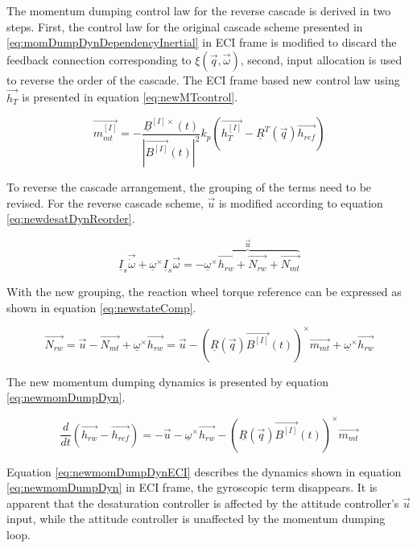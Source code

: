 The momentum dumping control law for the reverse cascade is derived in two steps. First, the control law for the original cascade scheme presented in \ref{eq:momDumpDynDependencyInertial} in ECI frame is modified to discard the feedback connection corresponding to $\xi(\vec{q}, \vec{\omega})$, second, input allocation is used to reverse the order of the cascade. The ECI frame based new control law using $\vec{h_T}$ is presented in equation \ref{eq:newMTcontrol}.

\begin{equation}
\label{eq:newMTcontrol}
\vec{m_{mt}^{[I]}} = -\frac{\underline{B}^{[I]\times}(t)}{|\vec{B^{[I]}}(t) |^2} k_p 
\left(\vec{h_{T}^{[I]}} - \underline{R}^T(\vec{q})\vec{h_{ref}} \right) 
\end{equation}			

To reverse the cascade arrangement, the grouping of the terms need to be revised. For the reverse cascade scheme, $\vec{u}$ is modified according to equation \ref{eq:newdesatDynReorder}.

\begin{equation}
\underline I_{s} \vec{\dot{\omega}} + \underline{\omega}^\times\underline I_{s} \vec{\omega} =    \overbrace{-\underline{\omega}^\times\vec{h_{rw}} + \vec{N_{rw}} +  \vec{N_{mt}}}^{\vec{u}}
\label{eq:newdesatDynReorder}
\end{equation}

With the new grouping, the reaction wheel torque reference can be expressed as shown in equation \ref{eq:newstateComp}.

\begin{equation}
\vec{N_{rw}} =  \vec{u} - \vec{N_{mt}} +  \underline{\omega}^\times\vec{h_{rw}} = 
\vec{u} - \left( \underline{R}(\vec{ q})  \vec{B^{[I]}}(t)\right)^\times \vec{m_{mt}}  +  \underline{\omega}^\times\vec{h_{rw}} 
\label{eq:newstateComp}
\end{equation}

The new momentum dumping dynamics is presented by equation \ref{eq:newmomDumpDyn}.

\begin{equation}
\label{eq:newmomDumpDyn}
\frac{d}{dt}(\vec{h_{rw}} - \vec{h_{ref}}) = -\vec{u} - \underline{\omega}^\times\vec{h_{rw}} - \left( \underline{R}(\vec{ q})  \vec{B^{[I]}}(t)\right)^\times \vec{m_{mt}}
\end{equation}

Equation \ref{eq:newmomDumpDynECI} describes the dynamics shown in equation \ref{eq:newmomDumpDyn} in ECI frame, the gyroscopic term disappears. It is apparent that the desaturation controller is affected by the attitude controller's $\vec{u}$ input, while the attitude controller is unaffected by the momentum dumping loop.

